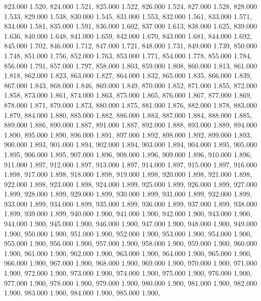 823.000 1.520, 
824.000 1.521, 
825.000 1.522, 
826.000 1.524, 
827.000 1.528, 
828.000 1.533, 
829.000 1.538, 
830.000 1.545, 
831.000 1.553, 
832.000 1.561, 
833.000 1.571, 
834.000 1.581, 
835.000 1.591, 
836.000 1.602, 
837.000 1.613, 
838.000 1.625, 
839.000 1.636, 
840.000 1.648, 
841.000 1.659, 
842.000 1.670, 
843.000 1.681, 
844.000 1.692, 
845.000 1.702, 
846.000 1.712, 
847.000 1.721, 
848.000 1.731, 
849.000 1.739, 
850.000 1.748, 
851.000 1.756, 
852.000 1.763, 
853.000 1.771, 
854.000 1.778, 
855.000 1.784, 
856.000 1.791, 
857.000 1.797, 
858.000 1.803, 
859.000 1.808, 
860.000 1.813, 
861.000 1.818, 
862.000 1.823, 
863.000 1.827, 
864.000 1.832, 
865.000 1.835, 
866.000 1.839, 
867.000 1.843, 
868.000 1.846, 
869.000 1.849, 
870.000 1.852, 
871.000 1.855, 
872.000 1.858, 
873.000 1.861, 
874.000 1.863, 
875.000 1.865, 
876.000 1.867, 
877.000 1.869, 
878.000 1.871, 
879.000 1.873, 
880.000 1.875, 
881.000 1.876, 
882.000 1.878, 
883.000 1.879, 
884.000 1.880, 
885.000 1.882, 
886.000 1.883, 
887.000 1.884, 
888.000 1.885, 
889.000 1.886, 
890.000 1.887, 
891.000 1.887, 
892.000 1.888, 
893.000 1.889, 
894.000 1.890, 
895.000 1.890, 
896.000 1.891, 
897.000 1.892, 
898.000 1.892, 
899.000 1.893, 
900.000 1.893, 
901.000 1.894, 
902.000 1.894, 
903.000 1.894, 
904.000 1.895, 
905.000 1.895, 
906.000 1.895, 
907.000 1.896, 
908.000 1.896, 
909.000 1.896, 
910.000 1.896, 
911.000 1.897, 
912.000 1.897, 
913.000 1.897, 
914.000 1.897, 
915.000 1.897, 
916.000 1.898, 
917.000 1.898, 
918.000 1.898, 
919.000 1.898, 
920.000 1.898, 
921.000 1.898, 
922.000 1.898, 
923.000 1.898, 
924.000 1.899, 
925.000 1.899, 
926.000 1.899, 
927.000 1.899, 
928.000 1.899, 
929.000 1.899, 
930.000 1.899, 
931.000 1.899, 
932.000 1.899, 
933.000 1.899, 
934.000 1.899, 
935.000 1.899, 
936.000 1.899, 
937.000 1.899, 
938.000 1.899, 
939.000 1.899, 
940.000 1.900, 
941.000 1.900, 
942.000 1.900, 
943.000 1.900, 
944.000 1.900, 
945.000 1.900, 
946.000 1.900, 
947.000 1.900, 
948.000 1.900, 
949.000 1.900, 
950.000 1.900, 
951.000 1.900, 
952.000 1.900, 
953.000 1.900, 
954.000 1.900, 
955.000 1.900, 
956.000 1.900, 
957.000 1.900, 
958.000 1.900, 
959.000 1.900, 
960.000 1.900, 
961.000 1.900, 
962.000 1.900, 
963.000 1.900, 
964.000 1.900, 
965.000 1.900, 
966.000 1.900, 
967.000 1.900, 
968.000 1.900, 
969.000 1.900, 
970.000 1.900, 
971.000 1.900, 
972.000 1.900, 
973.000 1.900, 
974.000 1.900, 
975.000 1.900, 
976.000 1.900, 
977.000 1.900, 
978.000 1.900, 
979.000 1.900, 
980.000 1.900, 
981.000 1.900, 
982.000 1.900, 
983.000 1.900, 
984.000 1.900, 
985.000 1.900, 
